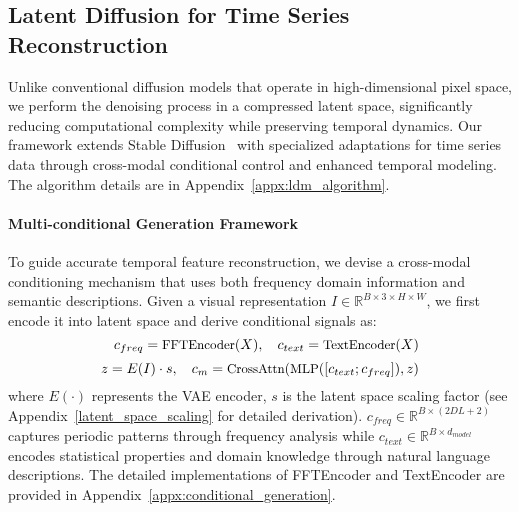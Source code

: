 \subsection{Latent Diffusion for Time Series Reconstruction}
Unlike conventional diffusion models that operate in high-dimensional pixel space, we perform the denoising process in a compressed latent space, significantly reducing computational complexity while preserving temporal dynamics. Our framework extends Stable Diffusion~\cite{rombach2022high} with specialized adaptations for time series data through cross-modal conditional control and enhanced temporal modeling. The algorithm details are in Appendix~\ref{appx:ldm_algorithm}.
\paragraph{Multi-conditional Generation Framework}
To guide accurate temporal feature reconstruction, we devise a cross-modal conditioning mechanism that uses both frequency domain information and semantic descriptions. Given a visual representation $I \in \mathbb{R}^{B \times 3 \times H \times W}$, we first encode it into latent space and derive conditional signals as:
\begin{equation}
\small
    \quad c_{freq} = \text{FFTEncoder}(X),\quad c_{text} = \text{TextEncoder}(X)
\end{equation}
\begin{equation}
\small
    z = E(I) \cdot s,\quad c_m = \text{CrossAttn}(\text{MLP}([c_{text}; c_{freq}]), z)
\end{equation}
where $E(\cdot)$ represents the VAE encoder, $s$ is the latent space scaling factor (see Appendix~\ref{latent_space_scaling} for detailed derivation). $c_{freq}\in \mathbb{R}^{B \times (2DL+2)}$ captures periodic patterns through frequency analysis while $c_{text}\in \mathbb{R}^{B \times d_{model}}$ encodes statistical properties and domain knowledge through natural language descriptions. The detailed implementations of FFTEncoder and TextEncoder are provided in Appendix~\ref{appx:conditional_generation}.

